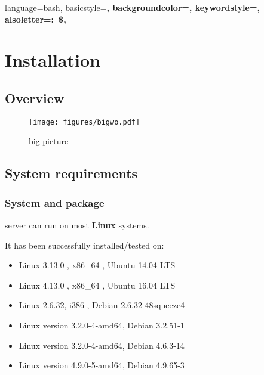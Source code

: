 {language=bash,
basicstyle=\scriptsize\ttfamily\color{white}\bfseries,
backgroundcolor=\color{charcoal},
keywordstyle=\color{white},
alsoletter={:~\$},
}

\chapter{Installation}

\section{Overview}

\begin{figure}[!h]
	\centering
	\texttt{[image: figures/bigwo.pdf]}
	\caption{\webobs big picture}
\end{figure}

\section{System requirements}

\subsection{System and package}

\webobs server can run on most \textbf{Linux} systems.

It has been successfully installed/tested on:
\begin{itemize}
\item   Linux 3.13.0 , x86\_64 , Ubuntu 14.04 LTS
\item   Linux 4.13.0 , x86\_64 , Ubuntu 16.04 LTS
\item   Linux 2.6.32, i386 , Debian 2.6.32-48squeeze4
\item   Linux version 3.2.0-4-amd64, Debian 3.2.51-1
\item   Linux version 3.2.0-4-amd64, Debian 4.6.3-14
\item   Linux version 4.9.0-5-amd64, Debian 4.9.65-3
\end{itemize}

